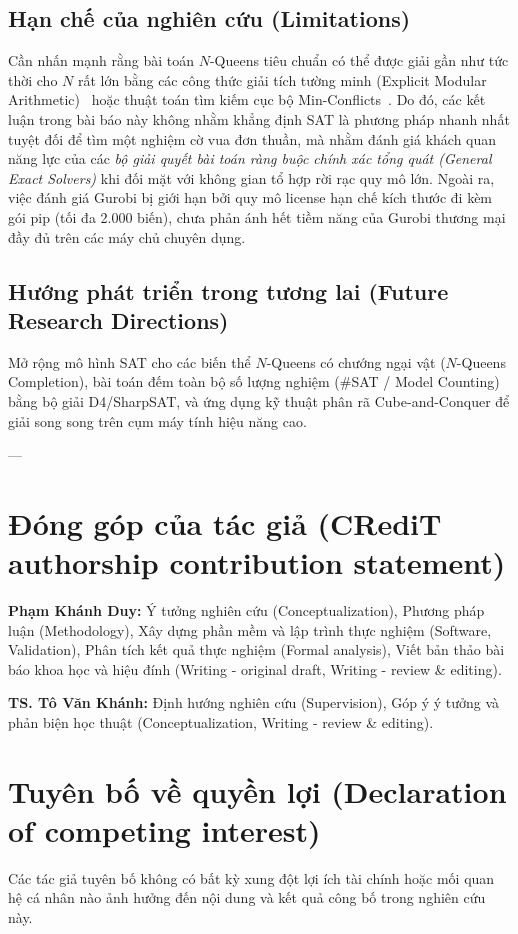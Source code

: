 \documentclass[11pt,a4paper]{article}
\begin{document}
\subsection{Hạn chế của nghiên cứu (Limitations)}
Cần nhấn mạnh rằng bài toán $N$-Queens tiêu chuẩn có thể được giải gần như tức thời cho $N$ rất lớn bằng các công thức giải tích tường minh (Explicit Modular Arithmetic)~\cite{bell2009survey} hoặc thuật toán tìm kiếm cục bộ Min-Conflicts~\cite{minton1992solving}. Do đó, các kết luận trong bài báo này không nhằm khẳng định SAT là phương pháp nhanh nhất tuyệt đối để tìm một nghiệm cờ vua đơn thuần, mà nhằm đánh giá khách quan năng lực của các \textit{bộ giải quyết bài toán ràng buộc chính xác tổng quát (General Exact Solvers)} khi đối mặt với không gian tổ hợp rời rạc quy mô lớn. Ngoài ra, việc đánh giá Gurobi bị giới hạn bởi quy mô license hạn chế kích thước đi kèm gói pip (tối đa 2.000 biến), chưa phản ánh hết tiềm năng của Gurobi thương mại đầy đủ trên các máy chủ chuyên dụng.

\subsection{Hướng phát triển trong tương lai (Future Research Directions)}
Mở rộng mô hình SAT cho các biến thể $N$-Queens có chướng ngại vật ($N$-Queens Completion), bài toán đếm toàn bộ số lượng nghiệm (\#SAT / Model Counting) bằng bộ giải D4/SharpSAT, và ứng dụng kỹ thuật phân rã Cube-and-Conquer để giải song song trên cụm máy tính hiệu năng cao.

---

\section*{Đóng góp của tác giả (CRediT authorship contribution statement)}
\textbf{Phạm Khánh Duy:} Ý tưởng nghiên cứu (Conceptualization), Phương pháp luận (Methodology), Xây dựng phần mềm và lập trình thực nghiệm (Software, Validation), Phân tích kết quả thực nghiệm (Formal analysis), Viết bản thảo bài báo khoa học và hiệu đính (Writing - original draft, Writing - review \& editing).

\textbf{TS. Tô Văn Khánh:} Định hướng nghiên cứu (Supervision), Góp ý ý tưởng và phản biện học thuật (Conceptualization, Writing - review \& editing).

\section*{Tuyên bố về quyền lợi (Declaration of competing interest)}
Các tác giả tuyên bố không có bất kỳ xung đột lợi ích tài chính hoặc mối quan hệ cá nhân nào ảnh hưởng đến nội dung và kết quả công bố trong nghiên cứu này.
\end{document}
